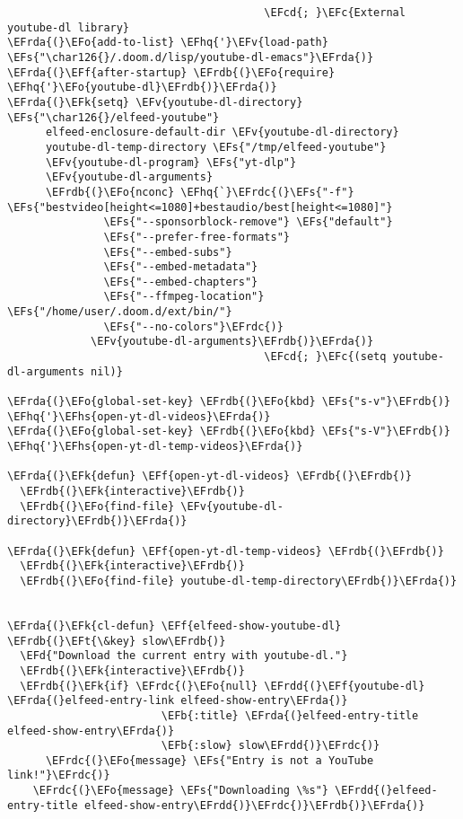 \documentclass[a4wide,10pt]{article}
\newcommand{\EFc}[1]{\textcolor{EFc}{#1}} %
\newcommand{\EFcd}[1]{\textcolor{EFcd}{#1}} %
\newcommand{\EFs}[1]{\textcolor{EFs}{#1}} %
\newcommand{\EFd}[1]{\textcolor{EFd}{#1}} %
\newcommand{\EFk}[1]{\textcolor{EFk}{#1}} %
\newcommand{\EFb}[1]{\textcolor{EFb}{#1}} %
\newcommand{\EFf}[1]{\textcolor{EFf}{#1}} %
\newcommand{\EFv}[1]{\textcolor{EFv}{#1}} %
\newcommand{\EFt}[1]{\textcolor{EFt}{#1}} %
\newcommand{\EFo}[1]{\textcolor{EFo}{#1}} %
\newcommand{\EFhq}[1]{\textcolor{EFhq}{#1}} %
\newcommand{\EFhs}[1]{\textcolor{EFhs}{#1}} %
\newcommand{\EFrda}[1]{\textcolor{EFrda}{#1}} %
\newcommand{\EFrdb}[1]{\textcolor{EFrdb}{#1}} %
\newcommand{\EFrdc}[1]{\textcolor{EFrdc}{#1}} %
\newcommand{\EFrdd}[1]{\textcolor{EFrdd}{#1}} %
\begin{document}
\begin{Code}
\begin{Verbatim}
                                        \EFcd{; }\EFc{External youtube-dl library}
\EFrda{(}\EFo{add-to-list} \EFhq{'}\EFv{load-path} \EFs{"\char126{}/.doom.d/lisp/youtube-dl-emacs"}\EFrda{)}
\EFrda{(}\EFf{after-startup} \EFrdb{(}\EFo{require} \EFhq{'}\EFo{youtube-dl}\EFrdb{)}\EFrda{)}
\EFrda{(}\EFk{setq} \EFv{youtube-dl-directory} \EFs{"\char126{}/elfeed-youtube"}
      elfeed-enclosure-default-dir \EFv{youtube-dl-directory}
      youtube-dl-temp-directory \EFs{"/tmp/elfeed-youtube"}
      \EFv{youtube-dl-program} \EFs{"yt-dlp"}
      \EFv{youtube-dl-arguments}
      \EFrdb{(}\EFo{nconc} \EFhq{`}\EFrdc{(}\EFs{"-f"} \EFs{"bestvideo[height<=1080]+bestaudio/best[height<=1080]"}
               \EFs{"--sponsorblock-remove"} \EFs{"default"}
               \EFs{"--prefer-free-formats"}
               \EFs{"--embed-subs"}
               \EFs{"--embed-metadata"}
               \EFs{"--embed-chapters"}
               \EFs{"--ffmpeg-location"} \EFs{"/home/user/.doom.d/ext/bin/"}
               \EFs{"--no-colors"}\EFrdc{)}
             \EFv{youtube-dl-arguments}\EFrdb{)}\EFrda{)}
                                        \EFcd{; }\EFc{(setq youtube-dl-arguments nil)}

\EFrda{(}\EFo{global-set-key} \EFrdb{(}\EFo{kbd} \EFs{"s-v"}\EFrdb{)} \EFhq{'}\EFhs{open-yt-dl-videos}\EFrda{)}
\EFrda{(}\EFo{global-set-key} \EFrdb{(}\EFo{kbd} \EFs{"s-V"}\EFrdb{)} \EFhq{'}\EFhs{open-yt-dl-temp-videos}\EFrda{)}

\EFrda{(}\EFk{defun} \EFf{open-yt-dl-videos} \EFrdb{(}\EFrdb{)}
  \EFrdb{(}\EFk{interactive}\EFrdb{)}
  \EFrdb{(}\EFo{find-file} \EFv{youtube-dl-directory}\EFrdb{)}\EFrda{)}

\EFrda{(}\EFk{defun} \EFf{open-yt-dl-temp-videos} \EFrdb{(}\EFrdb{)}
  \EFrdb{(}\EFk{interactive}\EFrdb{)}
  \EFrdb{(}\EFo{find-file} youtube-dl-temp-directory\EFrdb{)}\EFrda{)}


\EFrda{(}\EFk{cl-defun} \EFf{elfeed-show-youtube-dl} \EFrdb{(}\EFt{\&key} slow\EFrdb{)}
  \EFd{"Download the current entry with youtube-dl."}
  \EFrdb{(}\EFk{interactive}\EFrdb{)}
  \EFrdb{(}\EFk{if} \EFrdc{(}\EFo{null} \EFrdd{(}\EFf{youtube-dl} \EFrda{(}elfeed-entry-link elfeed-show-entry\EFrda{)}
                        \EFb{:title} \EFrda{(}elfeed-entry-title elfeed-show-entry\EFrda{)}
                        \EFb{:slow} slow\EFrdd{)}\EFrdc{)}
      \EFrdc{(}\EFo{message} \EFs{"Entry is not a YouTube link!"}\EFrdc{)}
    \EFrdc{(}\EFo{message} \EFs{"Downloading \%s"} \EFrdd{(}elfeed-entry-title elfeed-show-entry\EFrdd{)}\EFrdc{)}\EFrdb{)}\EFrda{)}



\end{Verbatim}
\end{Code}
\end{document}
